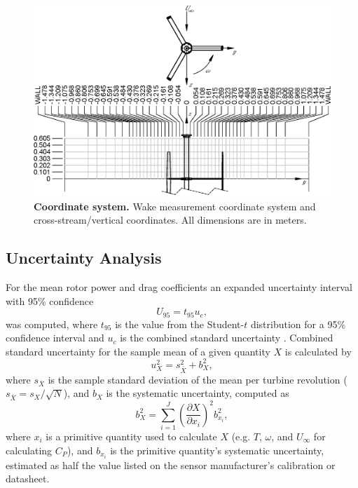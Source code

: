 \documentclass[10pt,letterpaper]{article}
\begin{document}
\begin{figure}
    \includegraphics[width=\textwidth]{figures/turbine_coordinate_system.eps}

    \caption{{\bf Coordinate system.} Wake measurement coordinate system and
    cross-stream/vertical coordinates. All dimensions are in meters.}

    \label{fig:coordinates}
\end{figure}


\subsection*{Uncertainty Analysis}

For the mean rotor power and drag coefficients an expanded uncertainty interval
with 95\% confidence
\begin{equation}
    U_{95} = t_{95} u_c,
\end{equation}
was computed, where $t_{95}$ is the value from the Student-$t$ distribution for
a 95\% confidence interval and $u_c$ is the combined standard uncertainty
\cite{ColemanSteele}. Combined standard uncertainty for the sample mean of a
given quantity $X$ is calculated by
\begin{equation}
    u_X^2 = s_{\bar{X}}^2 + b_X^2,
\end{equation}
where $s_{\bar{X}}$ is the sample standard deviation of the mean per turbine
revolution ($s_{\bar{X}} = s_X/\sqrt{N}$), and $b_X$ is the systematic
uncertainty, computed as
\begin{equation}
    b_{X}^2 = \sum_{i=1}^J \left( \frac{\partial X}{\partial x_i} \right)^2
    b_{x_i}^2,
\end{equation}
where $x_i$ is a primitive quantity used to calculate $X$ (e.g. $T$, $\omega$,
and $U_\infty$ for calculating $C_P$), and $b_{x_i}$ is the primitive quantity's
systematic uncertainty, estimated as half the value listed on the sensor
manufacturer's calibration or datasheet.
\end{document}
